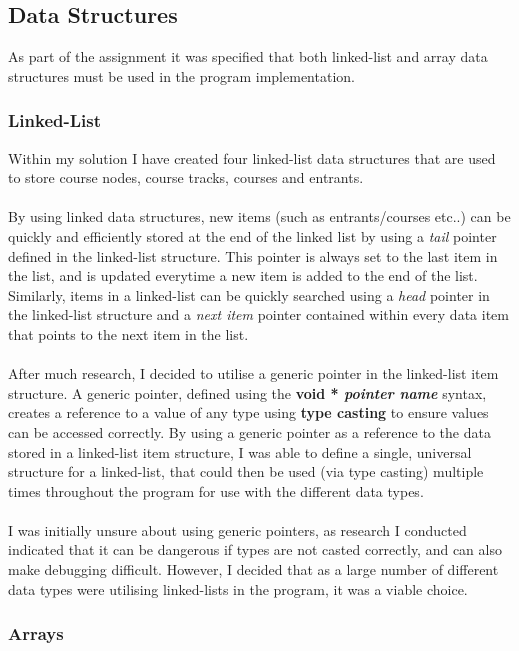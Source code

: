 \documentclass{article}
\begin{document}
\subsection{Data Structures}

As part of the assignment it was specified that both linked-list and array data structures must be used in the program implementation.

\subsubsection{Linked-List}

Within my solution I have created four linked-list data structures that are used to store course nodes, course tracks, courses and entrants. \\\\
By using linked data structures, new items (such as entrants/courses etc..) can be quickly and efficiently stored at the end of the linked list by using a \textit{tail} pointer defined in the linked-list structure. This pointer is always set to the last item in the list, and is updated everytime a new item is added to the end of the list. Similarly, items in a linked-list can be quickly searched using a \textit{head} pointer in the linked-list structure and a \textit{next item} pointer contained within every data item that points to the next item in the list. \\\\
After much research, I decided to utilise a generic pointer in the linked-list item structure. A generic pointer, defined using the \textbf{void * \textit{pointer name}} syntax, creates a reference to a value of any type using \textbf{type casting} to ensure values can be accessed correctly. By using a generic pointer as a reference to the data stored in a linked-list item structure, I was able to define a single, universal structure for a linked-list, that could then be used (via type casting) multiple times throughout the program for use with the different data types. \\\\
I was initially unsure about using generic pointers, as research I conducted indicated that it can be dangerous if types are not casted correctly, and can also make debugging difficult. However, I decided that as a large number of different data types were utilising linked-lists in the program, it was a viable choice.

\subsubsection{Arrays}
\end{document}
